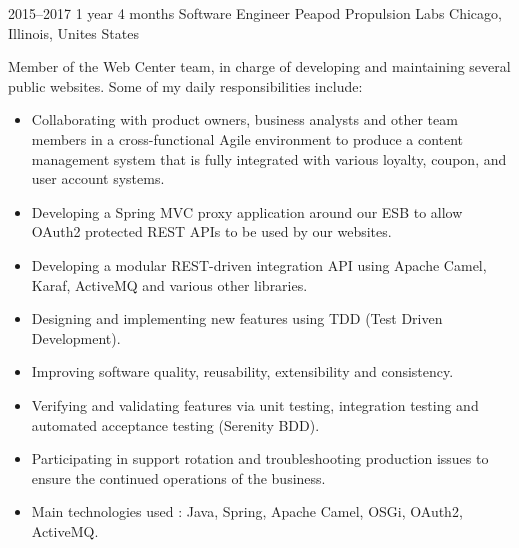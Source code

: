 \documentclass[]{friggeri-cv} %
\begin{document}
\begin{entrylist}

\entry
{2015--2017}
{1 year 4 months}
{Software Engineer} 
{Peapod Propulsion Labs}
{Chicago, Illinois, Unites States}
{Member of the Web Center team, in charge of developing and maintaining several public websites. Some of my daily responsibilities include:\\
\vspace{-4mm}
\begin{itemize}
	\item Collaborating with product owners, business analysts and other team members in a cross-functional Agile environment to produce a content management system that is fully integrated with various loyalty, coupon, and user account systems.
		\item Developing a Spring MVC proxy application around our ESB to allow OAuth2 protected REST APIs to be used by our websites.
	\item Developing a modular REST-driven integration API using Apache Camel, Karaf, ActiveMQ and various other libraries.
	\item Designing and implementing new features using TDD (Test Driven Development).
	\item Improving software quality, reusability, extensibility and consistency.
	\item Verifying and validating features via unit testing, integration testing and automated acceptance testing (Serenity BDD).
	\item Participating in support rotation and troubleshooting production issues to ensure the continued operations of the business.
	\item Main technologies used : Java, Spring, Apache Camel, OSGi, OAuth2, ActiveMQ.
\end{itemize}
}
\vspace{-7mm}

\end{entrylist}

\end{document}
